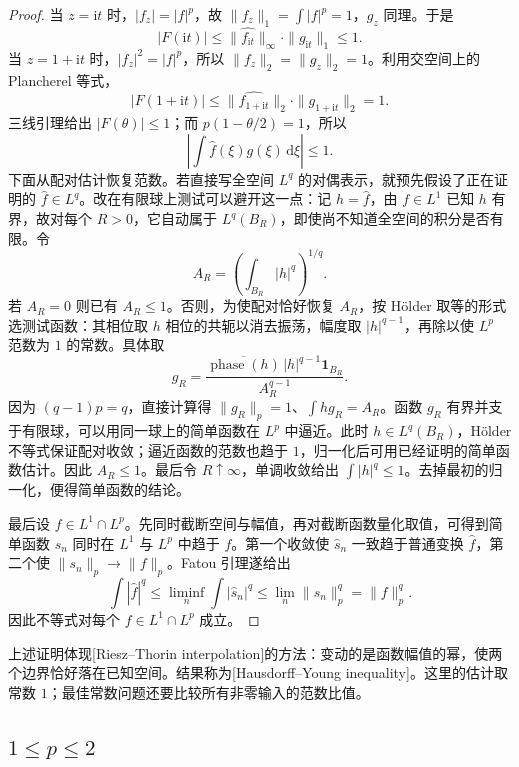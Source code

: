 \begin{proof}
当 \(z=\mathrm{i}t\) 时，\(|f_z|=|f|^p\)，故 \(\|f_z\|_1=\int|f|^p=1\)，\(g_z\) 同理。于是
\[
 |F(\mathrm{i}t)|\leq\|\widehat {f_{\mathrm{i}t}}\|_\infty\cdot\|g_{\mathrm{i}t}\|_1\leq1.
\]
当 \(z=1+\mathrm{i}t\) 时，\(|f_z|^2=|f|^p\)，所以 \(\|f_z\|_2=\|g_z\|_2=1\)。利用交空间上的 Plancherel 等式，
\[
 |F(1+\mathrm{i}t)|\leq\|\widehat {f_{1+\mathrm{i}t}}\|_2\cdot\|g_{1+\mathrm{i}t}\|_2=1.
\]
三线引理给出 \(|F(\theta)|\leq1\)；而 \(p(1-\theta/2)=1\)，所以
\[
 \left|\int\widehat f(\xi)g(\xi)\,\mathrm{d}\xi\right|\leq1.
\]
下面从配对估计恢复范数。若直接写全空间 \(L^q\) 的对偶表示，就预先假设了正在证明的 \(\widehat f\in L^q\)。改在有限球上测试可以避开这一点：记 \(h=\widehat f\)，由 \(f\in L^1\) 已知 \(h\) 有界，故对每个 \(R>0\)，它自动属于 \(L^q(B_R)\)，即使尚不知道全空间的积分是否有限。令
\[
 A_R=\left(\int_{B_R}|h|^q\right)^{1/q}.
\]
若 \(A_R=0\) 则已有 \(A_R\leq1\)。否则，为使配对恰好恢复 \(A_R\)，按 Hölder 取等的形式选测试函数：其相位取 \(h\) 相位的共轭以消去振荡，幅度取 \(|h|^{q-1}\)，再除以使 \(L^p\) 范数为 \(1\) 的常数。具体取
\[
 g_R=\frac{\overline{\operatorname{phase}(h)}\,|h|^{q-1}\mathbf1_{B_R}}{A_R^{q-1}}.
\]
因为 \((q-1)p=q\)，直接计算得 \(\|g_R\|_p=1\)、\(\int hg_R=A_R\)。函数 \(g_R\) 有界并支于有限球，可以用同一球上的简单函数在 \(L^p\) 中逼近。此时 \(h\in L^q(B_R)\)，Hölder 不等式保证配对收敛；逼近函数的范数也趋于 \(1\)，归一化后可用已经证明的简单函数估计。因此 \(A_R\leq1\)。最后令 \(R\uparrow\infty\)，单调收敛给出 \(\int|h|^q\leq1\)。去掉最初的归一化，便得简单函数的结论。

最后设 \(f\in L^1\cap L^p\)。先同时截断空间与幅值，再对截断函数量化取值，可得到简单函数 \(s_n\) 同时在 \(L^1\) 与 \(L^p\) 中趋于 \(f\)。第一个收敛使 \(\widehat s_n\) 一致趋于普通变换 \(\widehat f\)，第二个使 \(\|s_n\|_p\to\|f\|_p\)。Fatou 引理遂给出
\[
 \int|\widehat f|^q\leq\liminf_n\int|\widehat s_n|^q
 \leq\lim_n\|s_n\|_p^q=\|f\|_p^q.
\]
因此不等式对每个 \(f\in L^1\cap L^p\) 成立。
\end{proof}

上述证明体现[Riesz--Thorin interpolation]的方法：变动的是函数幅值的幂，使两个边界恰好落在已知空间。结果称为[Hausdorff--Young inequality]。这里的估计取常数 \(1\)；最佳常数问题还要比较所有非零输入的范数比值。

\subsection{\texorpdfstring{\(1\leq p\leq2\)}{1≤p≤2}}
\label{b2:subsec:04-lp-fourier-extension}
\label{b2:subsec:040204}

